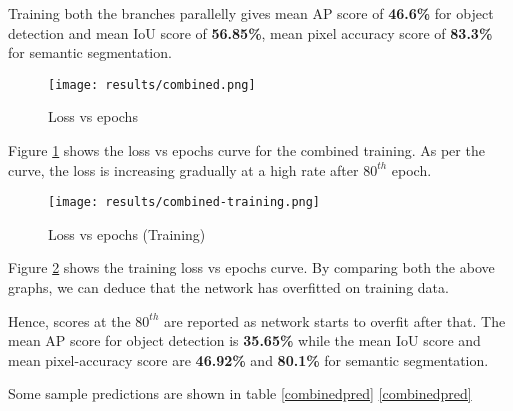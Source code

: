\par

Training both the branches parallelly gives mean AP score of \textbf{46.6\%} for object detection and mean IoU score of \textbf{56.85\%}, mean pixel accuracy score of \textbf{83.3\%} for semantic segmentation.

\par

\begin{figure}[h!]
    \centering
    \texttt{[image: results/combined.png]}
    \caption{Loss vs epochs}
    \label{combined}
\end{figure}

Figure \ref{combined} shows the loss vs epochs curve for the combined training. As per the curve, the loss is increasing gradually at a high rate after $80^{th}$ epoch. 

\begin{figure}[h!]
    \centering
    \texttt{[image: results/combined-training.png]}
    \caption{Loss vs epochs (Training)}
    \label{combined_training_fig}
\end{figure}

Figure \ref{combined_training_fig} shows the training loss vs epochs curve. By comparing both the above graphs, we can deduce that the network has overfitted on training data. 

Hence, scores at the $80^{th}$ are reported as network starts to overfit after that. The mean AP score for object detection is \textbf{35.65\%} while the mean IoU score and mean pixel-accuracy score are \textbf{46.92\%} and \textbf{80.1\%} for semantic segmentation. 


Some sample predictions are shown in table \ref{combinedpred}
\ref{combinedpred}

\newpage

